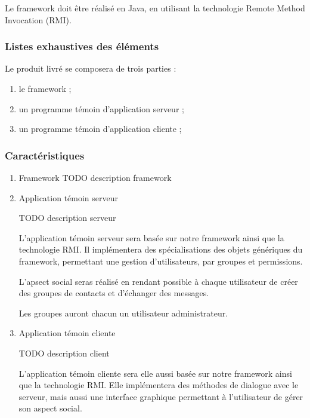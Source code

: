 Le framework doit être réalisé en Java, en utilisant la technologie Remote Method Invocation (RMI).

\subsubsection{Listes exhaustives des éléments} 
Le produit livré se composera de trois parties :
\begin{enumerate}
 \item le framework ;
 \item un programme témoin d'application serveur ;
 \item un programme témoin d'application cliente ;
\end{enumerate}

\subsubsection{Caractéristiques}
\begin{enumerate}
 \item Framework
TODO description framework
 \item Application témoin serveur

 TODO description serveur

L'application témoin serveur sera basée sur notre framework ainsi que la technologie RMI. Il implémentera des spécialisations des objets génériques du framework, permettant une gestion d'utilisateurs, par groupes et permissions.

L'apsect social seras réalisé en rendant possible à chaque utilisateur de créer des groupes de contacts et d'échanger des messages.

Les groupes auront chacun un utilisateur administrateur.

 \item Application témoin cliente

TODO description client

L'application témoin cliente sera elle aussi basée sur notre framework ainsi que la technologie RMI.
Elle implémentera des méthodes de dialogue avec le serveur, mais aussi une interface graphique permettant à l'utilisateur de gérer son aspect social.
\end{enumerate}
